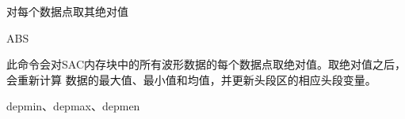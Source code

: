 \label{cmd:abs}

对每个数据点取其绝对值

\begin{SACSTX}
ABS
\end{SACSTX}

此命令会对SAC内存块中的所有波形数据的每个数据点取绝对值。取绝对值之后，会重新计算
数据的最大值、最小值和均值，并更新头段区的相应头段变量。

depmin、depmax、depmen
